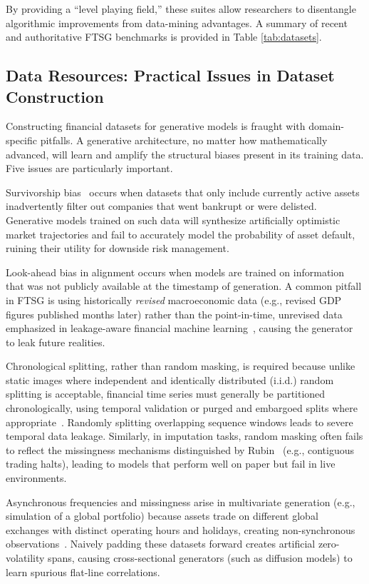 By providing a ``level playing field,'' these suites allow researchers to disentangle algorithmic improvements from data-mining advantages. A summary of recent and authoritative FTSG benchmarks is provided in Table \ref{tab:datasets}.

\subsection{Data Resources: Practical Issues in Dataset Construction}
Constructing financial datasets for generative models is fraught with domain-specific pitfalls. A generative architecture, no matter how mathematically advanced, will learn and amplify the structural biases present in its training data. Five issues are particularly important.

Survivorship bias~\citep{brown1992survivorship} occurs when datasets that only include currently active assets inadvertently filter out companies that went bankrupt or were delisted. Generative models trained on such data will synthesize artificially optimistic market trajectories and fail to accurately model the probability of asset default, ruining their utility for downside risk management.

Look-ahead bias in alignment occurs when models are trained on information that was not publicly available at the timestamp of generation. A common pitfall in FTSG is using historically \textit{revised} macroeconomic data (e.g., revised GDP figures published months later) rather than the point-in-time, unrevised data emphasized in leakage-aware financial machine learning~\citep{lopezdeprado2018advances}, causing the generator to leak future realities.

Chronological splitting, rather than random masking, is required because unlike static images where independent and identically distributed (i.i.d.) random splitting is acceptable, financial time series must generally be partitioned chronologically, using temporal validation or purged and embargoed splits where appropriate~\citep{lopezdeprado2018advances}. Randomly splitting overlapping sequence windows leads to severe temporal data leakage. Similarly, in imputation tasks, random masking often fails to reflect the missingness mechanisms distinguished by Rubin~\citep{rubin1976inference} (e.g., contiguous trading halts), leading to models that perform well on paper but fail in live environments.

Asynchronous frequencies and missingness arise in multivariate generation (e.g., simulation of a global portfolio) because assets trade on different global exchanges with distinct operating hours and holidays, creating non-synchronous observations~\citep{hayashi2005covariance}. Naively padding these datasets forward creates artificial zero-volatility spans, causing cross-sectional generators (such as diffusion models) to learn spurious flat-line correlations.

